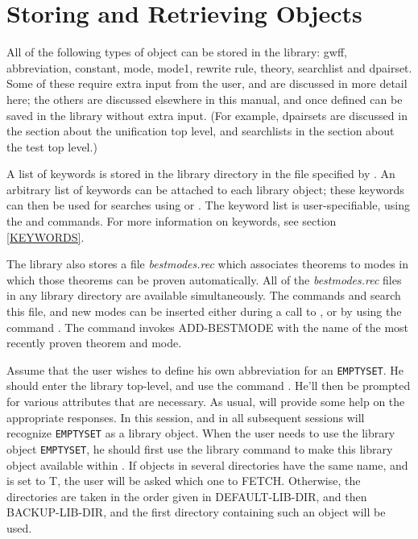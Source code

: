 \section{Storing and Retrieving Objects}

All of the following types of object can be stored in the library: gwff, abbreviation, constant,
mode, mode1, rewrite rule, theory, searchlist and dpairset. Some of these require extra input from the
user, and are discussed in more detail here; the others are discussed elsewhere in this manual,
and once defined can be saved in the library without extra input. (For example, dpairsets are discussed
in the section about the unification top level, and searchlists in the section about the test top level.)

A list of keywords is stored in the library directory in the file specified by .
An arbitrary list of keywords can be attached to each library object; these keywords can then be used for
searches using  or . The keyword list is user-specifiable,
using the  and  commands.  For more information
on keywords, see section \ref{KEYWORDS}.

The library also stores a file {\it bestmodes.rec} which associates theorems to modes in which those theorems
can be proven automatically. All of the {\it bestmodes.rec} files in any library directory are available
simultaneously. The commands  and  search this
file, and new modes can be inserted either during a call to , or by using the command
. The  command invokes ADD-BESTMODE with the name of the
most recently proven theorem and mode.

Assume that the user wishes to define his own abbreviation for an {\tt EMPTYSET}.
He should enter the library top-level, and use the command
. He'll then be prompted for various attributes that are
necessary. As usual,  will provide some help on the
appropriate responses.
In this session, and in all subsequent sessions {\TPS} will recognize
{\tt EMPTYSET} as a library object. When the user needs to use the
library object {\tt EMPTYSET}, he should first use the library command
 to make this library object available within {\TPS}.
If objects in several directories have the same name, and  is set to T,
the user will be asked which one to FETCH. Otherwise, the directories are taken in the order given in
DEFAULT-LIB-DIR, and then BACKUP-LIB-DIR, and the first directory containing such an object will be
used.

